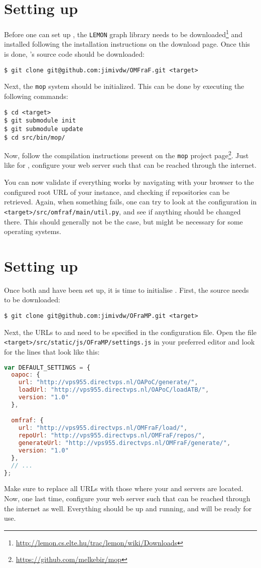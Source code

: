 \section[\omfraf]{Setting up \omfraf}
\vspace{-.1cm}
Before one can set up \omfraf, the \verb|LEMON| graph library needs to be downloaded\footnote{\url{http://lemon.cs.elte.hu/trac/lemon/wiki/Downloads}} and installed following the installation instructions on the download page. Once this is done, \omfraf's source code should be downloaded:
\begin{lstlisting}
$ git clone git@github.com:jimivdw/OMFraF.git <target>
\end{lstlisting}
Next, the \verb|mop| system should be initialized. This can be done by executing the following commands:
\begin{lstlisting}
$ cd <target>
$ git submodule init
$ git submodule update
$ cd src/bin/mop/
\end{lstlisting}
Now, follow the compilation instructions present on the \verb|mop| project page\footnote{\url{https://github.com/melkebir/mop}}. Just like for \oapoc, configure your web server such that \omfraf{} can be reached through the internet.

You can now validate if everything works by navigating with your browser to the configured root URL of your \omfraf{} instance, and checking if repositories can be retrieved. Again, when something fails, one can try to look at the configuration in \verb|<target>/src/omfraf/main/util.py|, and see if anything should be changed there. This should generally not be the case, but might be necessary for some operating systems.



\section[\oframp]{Setting up \oframp}
Once both \oapoc{} and \omfraf{} have been set up, it is time to initialise \oframp. First, the source needs to be downloaded:
\begin{lstlisting}
$ git clone git@github.com:jimivdw/OFraMP.git <target>
\end{lstlisting}
Next, the URLs to \oapoc{} and \omfraf{} need to be specified in the configuration file. Open the file \verb|<target>/src/static/js/OFraMP/settings.js| in your preferred editor and look for the lines that look like this:
\begin{lstlisting}[language=JavaScript]
var DEFAULT_SETTINGS = {
  oapoc: {
    url: "http://vps955.directvps.nl/OAPoC/generate/",
    loadUrl: "http://vps955.directvps.nl/OAPoC/loadATB/",
    version: "1.0"
  },

  omfraf: {
    url: "http://vps955.directvps.nl/OMFraF/load/",
    repoUrl: "http://vps955.directvps.nl/OMFraF/repos/",
    generateUrl: "http://vps955.directvps.nl/OMFraF/generate/",
    version: "1.0"
  },
  // ...
};
\end{lstlisting}
Make sure to replace all URLs with those where your \oapoc{} and \omfraf{} servers are located. Now, one last time, configure your web server such that \oframp{} can be reached through the internet as well. Everything should be up and running, and \oframp{} will be ready for use.
